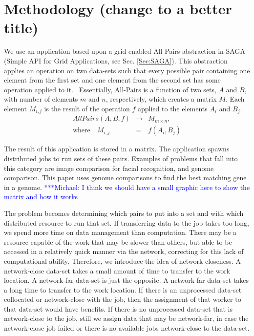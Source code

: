 \documentclass{rspublic}
\newcommand{\micnote}[1]{ {\textcolor{blue} { ***Michael: #1 }}}
\begin{document}
\section {Methodology (change to a better title)} We use an application
based upon a grid-enabled All-Pairs abstraction in SAGA (Simple API for
Grid Applications, see Sec. \ref{Sec:SAGA}). This abstraction applies an
operation on two data-sets such that every possible pair containing one
element from the first set and one element from the second set has some
operation applied to it.~\citep{Interop, AllPairs} Essentially,
All-Pairs is a function of two sets, $A$ and $B$, with number of
elements $m$ and $n$, respectively, which creates a matrix $M$. Each
element $M_{i,j}$ is the result of the operation $f$ applied to the
elements $A_i$ and $B_j$.
\begin{eqnarray}
 AllPairs(A, B, f) & \rightarrow & M_{m \times n}, \\
\mbox{where} \quad M_{i,j} & = & f(A_{i},B_{j})
 \end{eqnarray}
 
The result of this application is stored in a matrix. The application
spawns distributed jobs to run sets of these pairs. Examples of
problems that fall into this category are image comparison for facial
recognition, and genome comparison. This paper uses genome comparisons
to find the best matching gene in a genome. \micnote{I think we should
have a small graphic here to show the matrix and how it works} 

The problem becomes determining which pairs to put into a set and with
which distributed resource to run that set. If transferring data to the
job takes too long, we spend more time on data management than
computation.  There may be a resource capable of the work that may be
slower than others, but able to be accessed in a relatively quick manner
via the network, correcting for this lack of computational ability.
Therefore, we introduce the idea of network-closeness. A network-close
data-set takes a small amount of time to transfer to the work location.
A network-far data-set is just the opposite. A network-far data-set
takes a long time to transfer to the work location. If there is an
unprocessed data-set collocated or network-close with the job, then the
assignment of that worker to that data-set would have benefits. If there
is no unprocessed data-set that is network-close to the job, still we
assign data that may be network-far, in case the network-close job
failed or there is no available jobs network-close to the data-set.
\end{document}
